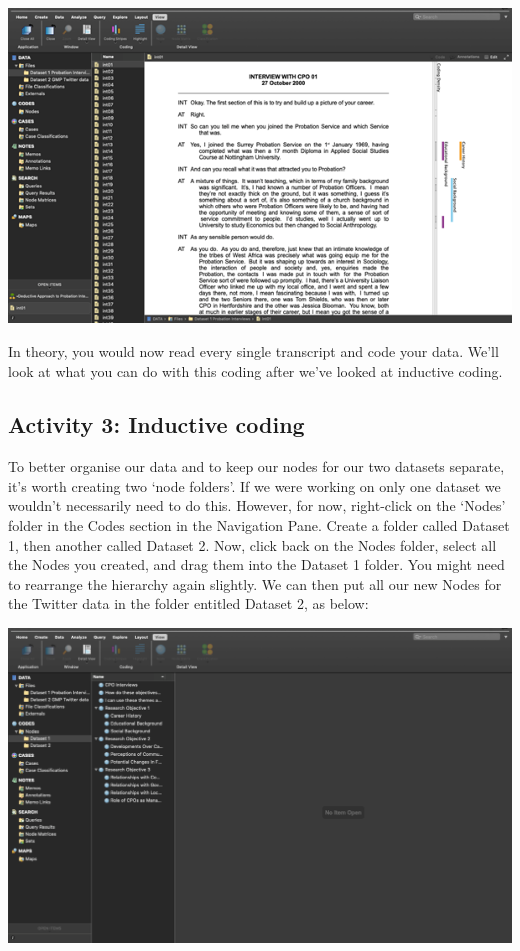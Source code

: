 \documentclass[
]{book}
\begin{document}
\includegraphics{imgs/codes_view.png}

In theory, you would now read every single transcript and code your data. We'll look at what you can do with this coding after we've looked at inductive coding.

\hypertarget{activity-3-inductive-coding}{%
\subsection{Activity 3: Inductive coding}\label{activity-3-inductive-coding}}

To better organise our data and to keep our nodes for our two datasets separate, it's worth creating two `node folders'. If we were working on only one dataset we wouldn't necessarily need to do this. However, for now, right-click on the `Nodes' folder in the Codes section in the Navigation Pane. Create a folder called Dataset 1, then another called Dataset 2. Now, click back on the Nodes folder, select all the Nodes you created, and drag them into the Dataset 1 folder. You might need to rearrange the hierarchy again slightly. We can then put all our new Nodes for the Twitter data in the folder entitled Dataset 2, as below:

\includegraphics{imgs/inductive.png}
\end{document}
